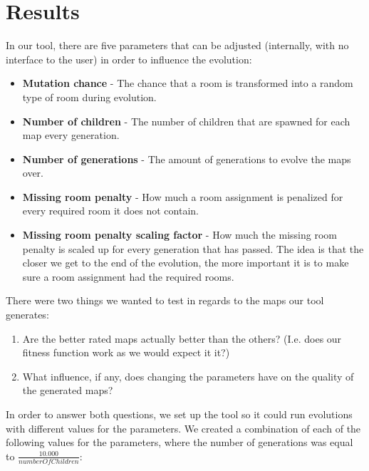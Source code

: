 \section{Results}
\label{05}

In our tool, there are five parameters that can be adjusted (internally, with no interface to the user) in order to influence the evolution: 

\begin{itemize}

	\item \textbf{Mutation chance} - The chance that a room is transformed into a random type of room during evolution.

	\item \textbf{Number of children} - The number of children that are spawned for each map every generation.

	\item \textbf{Number of generations} - The amount of generations to evolve the maps over.

	\item \textbf{Missing room penalty} - How much a room assignment is penalized for every required room it does not contain.

	\item \textbf{Missing room penalty scaling factor} - How much the missing room penalty is scaled up for every generation that has passed. The idea is that the closer we get to the end of the evolution, the more important it is to make sure a room assignment had the required rooms.

\end{itemize}

There were two things we wanted to test in regards to the maps our tool generates:

\begin{enumerate}

	\item Are the better rated maps actually better than the others? (I.e. does our fitness function work as we would expect it it?)

	\item What influence, if any, does changing the parameters have on the quality of the generated maps?

\end{enumerate}

In order to answer both questions, we set up the tool so it could run evolutions with different values for the parameters. We created a combination of each of the following values for the parameters, where the number of generations was equal to $\frac{10.000}{numberOfChildren}$:

